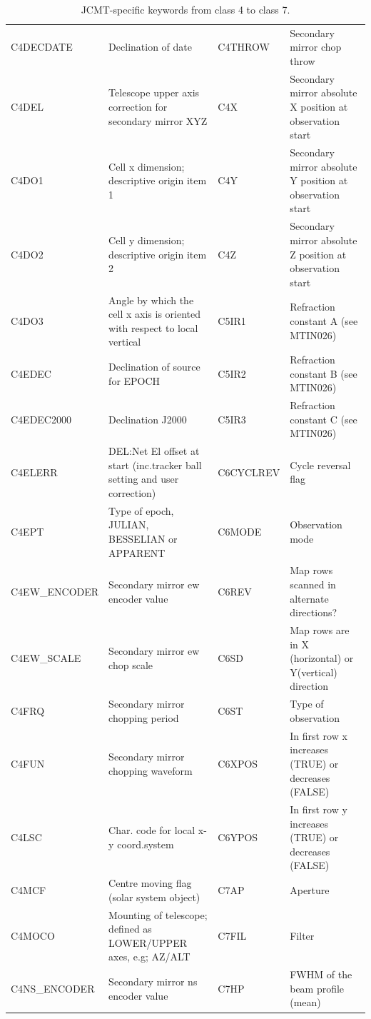 \documentclass[final,authoryear,5p,times,twocolumn]{elsarticle}
\begin{document}
\begin{table}[t]
\caption{JCMT-specific keywords from class 4 to class 7.}
\label{tab:appa2}
\begin{tabular}{|lp{2.0in}|lp{2.0in}|}
\hline
C4DECDATE & Declination of date & C4THROW & Secondary mirror chop throw\\
C4DEL & Telescope upper axis correction for secondary mirror XYZ & C4X & Secondary mirror absolute X position at observation start\\
C4DO1 & Cell x dimension; descriptive origin item 1 & C4Y & Secondary mirror absolute Y position at observation start\\
C4DO2 & Cell y dimension; descriptive origin item 2 & C4Z & Secondary mirror absolute Z position at observation start\\
C4DO3 & Angle by which the cell x axis is oriented with respect to local vertical & C5IR1 & Refraction constant A (see MTIN026)\\
C4EDEC & Declination of source for EPOCH & C5IR2 & Refraction constant B (see MTIN026)\\
C4EDEC2000 & Declination J2000 & C5IR3 & Refraction constant C (see MTIN026)\\
C4ELERR & DEL:Net El offset at start (inc.tracker ball setting and user correction) & C6CYCLREV & Cycle reversal flag\\
C4EPT & Type of epoch, JULIAN, BESSELIAN or APPARENT & C6MODE & Observation mode\\
C4EW\_ENCODER & Secondary mirror ew encoder value & C6REV & Map rows scanned in alternate directions?\\
C4EW\_SCALE & Secondary mirror ew chop scale & C6SD & Map rows are in X (horizontal) or Y(vertical) direction\\
C4FRQ & Secondary mirror chopping period & C6ST & Type of observation\\
C4FUN & Secondary mirror chopping waveform & C6XPOS & In first row x increases (TRUE) or decreases (FALSE)\\
C4LSC & Char. code for local x-y coord.system & C6YPOS & In first row y increases (TRUE) or decreases (FALSE)\\
C4MCF & Centre moving flag (solar system object) & C7AP & Aperture\\
C4MOCO & Mounting of telescope; defined as LOWER/UPPER axes, e.g; AZ/ALT & C7FIL & Filter\\
C4NS\_ENCODER & Secondary mirror ns encoder value & C7HP & FWHM of the beam profile (mean)\\

\end{tabular}
\end{table}
\end{document}
